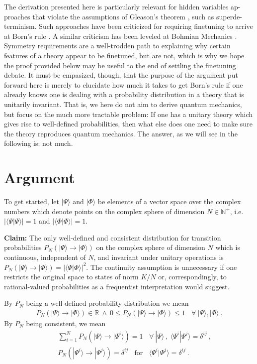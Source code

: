 \documentclass[12pt]{article}
\def\beqn{\begin{eqnarray}}
\def\eeqn{\end{eqnarray}}
\begin{document}
The derivation presented here is particularly relevant for hidden variables ap- proaches that violate the assumptions of Gleason’s theorem \cite{Gleason}, such as superde- terminism. Such approaches have been criticized for requiring finetuning to arrive at Born’s rule \cite{wood, sen1, sen2}. A similar criticism has been leveled at Bohmian Mechanics \cite{colin}. Symmetry requirements are a well-trodden path to explaining why certain features of a theory appear to be finetuned, but are not, which is why we hope the proof provided below may be useful to the end of settling the finetuning debate.
It must be empasized, though, that the purpose of the argument put forward here is merely to elucidate how much it takes to get Born’s rule if one already knows one is dealing with a probability distribution in a theory that is unitarily invariant. That is, we here do not aim to derive quantum mechanics, but focus on the much more tractable problem: If one has a unitary theory which gives rise to well-defined probabilities, then what else does one need to make sure the theory reproduces quantum mechanics. The answer, as we will see in the following is: not much.

\section{Argument}

To get started, let $|\Psi \rangle$ and $|\Phi \rangle$ be elements of a vector space over the complex numbers which denote points on the complex sphere of dimension $N \in {\mathbb{N}}^+$, i.e. $|\langle \Psi | \Psi \rangle| =1$ and $|\langle \Phi | \Phi \rangle| =1$.
\bigskip

{\bf Claim:} The only well-defined and consistent distribution for transition probabilities $P_N(|\Psi\rangle \to |\Phi\rangle)$ on the complex sphere of dimension $N$ which is continuous, independent of $N$, and invariant under unitary operations is $P_N(| \Psi \rangle \to |\Phi \rangle) = |\langle \Psi | \Phi \rangle|^2$. The continuity assumption is unnecessary if one restricts the original space to states of norm $K/N$ or, correspondingly, to rational-valued probabilities as a frequentist interpretation would suggest. 
\bigskip

\noindent By $P_N$ being a well-defined probability distribution we mean
\beqn
P_N(|\Psi\rangle \to |\Phi\rangle) \in \mathbb{R} ~\wedge~ 0 \leq P_N(|\Psi\rangle \to |\Phi\rangle) \leq 1 ~~~~\forall~ |\Psi \rangle, |\Phi \rangle ~. \label{welldef}
\eeqn
By $P_N$ being consistent, we mean
\beqn
&& \sum_{i=1}^N P_N(|\Psi\rangle \to |\Psi^i\rangle) = 1 ~~~~ \forall~ |\Psi \rangle~,~ \langle \Psi^i |\Psi^j\rangle = \delta^{ij} ~, \label{norm} \\
&& P_N(|\Psi^i\rangle \to |\Psi^j\rangle) = \delta^{ij} ~~~~ {\mbox{for}}~~~~ \langle \Psi^i |\Psi^j\rangle = \delta^{ij} \label{orth}~.
\eeqn
\end{document}
